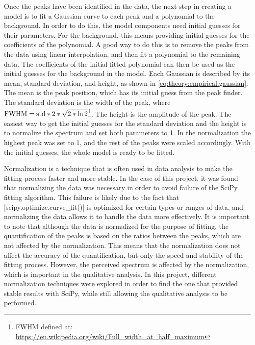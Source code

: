 Once the peaks have been identified in the data, the next step in creating a model is to fit a Gaussian curve to each peak and a polynomial to the background.
In order to do this, the model components need initial guesses for their parameters.
For the background, this means providing initial guesses for the coefficients of the polynomial.
A good way to do this is to remove the peaks from the data using linear interpolation, and then fit a polynomial to the remaining data.
The coefficients of the initial fitted polynomial can then be used as the initial guesses for the background in the model.
Each Gaussian is described by its mean, standard deviation, and height, as shown in \cref{eq:theory:empirical:gaussian}.
The mean is the peak position, which has its initial guess from the peak finder.
The standard deviation is the width of the peak, where $\textnormal{FWHM} = \textnormal{std}*2*\sqrt{2*\ln{2}}$\footnote{FWHM defined at: \url{https://en.wikipedia.org/wiki/Full_width_at_half_maximum}}.
The height is the amplitude of the peak.
The easiest way to get the initial guesses for the standard deviation and the height is to normalize the spectrum and set both parameters to 1.
In the normalization the highest peak was set to 1, and the rest of the peaks were scaled accordingly.
With the initial guesses, the whole model is ready to be fitted.

Normalization is a technique that is often used in data analysis to make the fitting process faster and more stable.
In the case of this project, it was found that normalizing the data was necessary in order to avoid failure of the SciPy fitting algorithm.
This failure is likely due to the fact that \cverb|scipy.optimize.curve_fit()| is optimized for certain types or ranges of data, and normalizing the data allows it to handle the data more effectively.
It is important to note that although the data is normalized for the purpose of fitting, the quantification of the peaks is based on the ratios between the peaks, which are not affected by the normalization.
This means that the normalization does not affect the accuracy of the quantification, but only the speed and stability of the fitting process.
However, the perceived spectrum is affected by the normalization, which is important in the qualitative analysis.
In this project, different normalization techniques were explored in order to find the one that provided stable results with SciPy, while still allowing the qualitative analysis to be performed.


